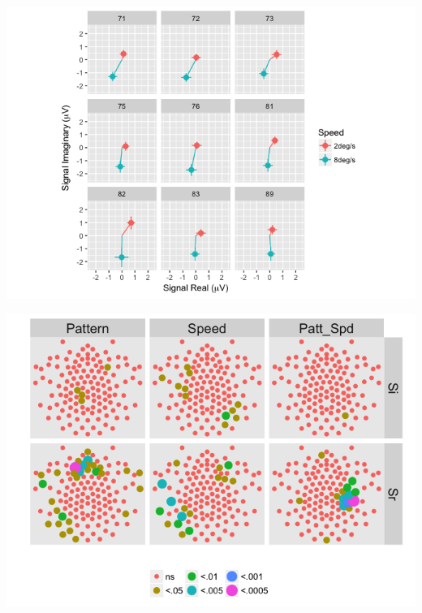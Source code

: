 \documentclass[landscape,final,paperwidth=48in,paperheight=33in,fontscale=0.285]{baposter}
\begin{document}
\begin{poster}
{\begin{center}
 \includegraphics[scale=0.3,valign=t]{figX-complex-domain-speed-1.png}
 \end{center}
 }

    {
 \begin{center}

 \includegraphics[scale=0.3,valign=t]{channel-effects-plot-2F1.png}
 

\end{center}}
\end{poster}
\end{document}
